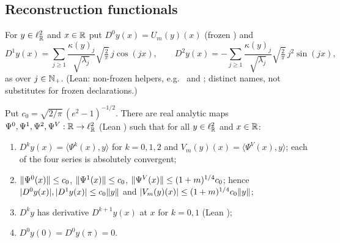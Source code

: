 \subsection{Reconstruction functionals}\label{bpW:w2:functionals-sec}

\begin{definition}\label{bpW:w2:derived}
For $y\in\ell^2_{\mathbb{R}}$ and $x\in\mathbb{R}$ put $D^0y(x)=U_m(y)(x)$ (frozen ) and
\[D^1y(x)=\sum_{j\ge1}\frac{\kappa(y)_j}{\sqrt{\lambda_j}}\sqrt{\tfrac2\pi}\,j\cos(jx),\qquad
D^2y(x)=-\sum_{j\ge1}\frac{\kappa(y)_j}{\sqrt{\lambda_j}}\sqrt{\tfrac2\pi}\,j^2\sin(jx),\]
as  over $j\in\mathbb{N}_+$. (Lean: non-frozen helpers, e.g.\  and
; distinct names, not substitutes for frozen declarations.)
\end{definition}

\begin{lemma}\label{bpW:w2:functionals}
Put $c_0=\sqrt{2/\pi}\,(e^2-1)^{-1/2}$. There are real analytic maps $\Psi^0,\Psi^1,\Psi^2,\Psi^V:\mathbb{R}\to\ell^2_{\mathbb{R}}$
(Lean ) such that for all $y\in\ell^2_{\mathbb{R}}$ and $x\in\mathbb{R}$:
\begin{enumerate}[label=(\roman*)]
\item $D^ky(x)=\langle\Psi^k(x),y\rangle$ for $k=0,1,2$ and $V_m(y)(x)=\langle\Psi^V(x),y\rangle$; each of the four
  series is absolutely convergent;
\item $\lVert \Psi^0(x)\rVert\le c_0$, $\lVert \Psi^1(x)\rVert\le c_0$, $\lVert \Psi^V(x)\rVert\le(1+m)^{1/4}c_0$; hence
  $\lvert D^0y(x)\rvert,\lvert D^1y(x)\rvert\le c_0\lVert y\rVert$ and $\lvert V_m(y)(x)\rvert\le(1+m)^{1/4}c_0\lVert y\rVert$;
\item $D^ky$ has derivative $D^{k+1}y(x)$ at $x$ for $k=0,1$ (Lean );
\item $D^0y(0)=D^0y(\pi)=0$.
\end{enumerate}
\end{lemma}

